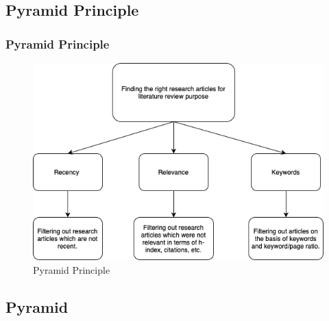 \documentclass[
	11pt, %
]{beamer}
\begin{document}

\subsection{Pyramid Principle}

\begin{frame}
	\frametitle{Pyramid Principle}
	
	\begin{figure}
		\includegraphics[width=0.8\linewidth]{Images/pyramid.png}
		\caption{Pyramid Principle}
	\end{figure}
\end{frame}

\subsection{Pyramid}



\end{document}
